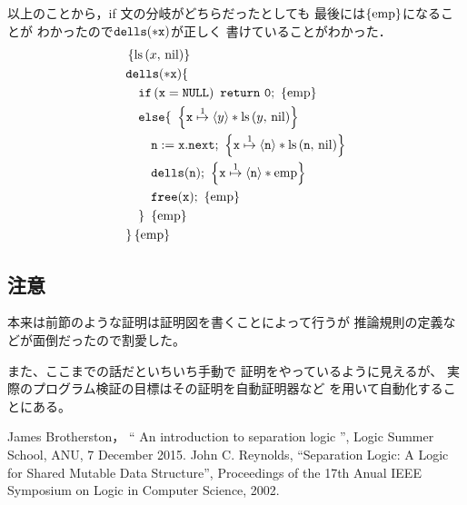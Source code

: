 \documentclass[a4paper, 10pt]{ltjsarticle}
\begin{document}
  以上のことから，if 文の分岐がどちらだったとしても
  最後には$\left\{\mathrm{emp}\right\}$になることが
  わかったので$\mathtt{dells(*x)}$が正しく
  書けていることがわかった．
  \begin{align*}
   &  \left\{\mathprls{x}{\mathvalnil}\right\}\\
   & \mathprogramsy{dells(*x)} \{  \\
   &\quad \mathprogramsy{if\left(x = NULL\right)\ return\ 0;}\ \left\{\mathemp\right\}
   \\
     &\quad   \mathprogramsy{else \{}\  
   \left\{ \mathprogramsy{x} \mathpointer{1} \left\langle y \right\rangle * \mathprls{y}{\mathvalnil}  \right\} \\
     &\qquad  \mathprogramsy{n := x.next;}\  \left\{ \mathprogramsy{x} \mathpointer{1} \left\langle \mathprogramsy{n} \right\rangle * \mathprls{\mathprogramsy{n}}{\mathvalnil}  \right\} \\
     &\qquad  \mathprogramsy{dells(n);}\ \left\{ \mathprogramsy{x} \mathpointer{1} \left\langle \mathprogramsy{n} \right\rangle * \mathemp \right\} \\
      &\qquad  \mathprogramsy{free(x);}\ \left\{ \mathemp \right\} \\
      &\quad \mathprogramsy{\}}\ \left\{ \mathemp \right\} \\
      &\mathprogramsy{\}} \left\{\mathemp\right\}
  \end{align*}

  \subsection*{注意}

  本来は前節のような証明は証明図を書くことによって行うが
  推論規則の定義などが面倒だったので割愛した。

  また、ここまでの話だといちいち手動で
  証明をやっているように見えるが、
  実際のプログラム検証の目標はその証明を自動証明器など
  を用いて自動化することにある。

  \begin{thebibliography}{9}
   James Brotherston，
	  `` An introduction to separation logic '', 
	  Logic Summer School, ANU, 7 December 2015.
   John C. Reynolds, ``Separation Logic: A Logic for Shared Mutable Data Structure'', Proceedings of the 17th Anual IEEE Symposium on Logic in Computer Science, 2002.
  \end{thebibliography} 
\end{document}

